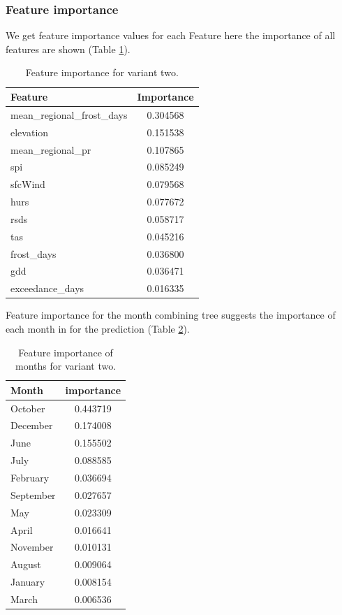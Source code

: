 \documentclass{article}
\begin{document}
\subsubsection{Feature importance}
We get feature importance values for each Feature here the importance of all features are shown (Table \ref{table:feature_importance_variant_2}).
\begin{table}[H]
	\centering
	\begin{tabular}{lc}
		\hline
		Feature                     & Importance \\
		\hline
		mean\_regional\_frost\_days & 0.304568   \\
		elevation                   & 0.151538   \\
		mean\_regional\_pr          & 0.107865   \\
		spi                         & 0.085249   \\
		sfcWind                     & 0.079568   \\
		hurs                        & 0.077672   \\
		rsds                        & 0.058717   \\
		tas                         & 0.045216   \\
		frost\_days                 & 0.036800   \\
		gdd                         & 0.036471   \\
		exceedance\_days            & 0.016335   \\
		\hline
	\end{tabular}
	\caption{\label{table:feature_importance_variant_2} Feature importance for variant two.}
\end{table}
Feature importance for the month combining tree suggests the importance of each month in for the prediction (Table \ref{table:feature_importance_months_variant_2}).
\begin{table}[H]
	\centering
	\begin{tabular}{lc}
		\hline
		Month     & importance \\
		\hline
		October   & 0.443719   \\
		December  & 0.174008   \\
		June      & 0.155502   \\
		July      & 0.088585   \\
		February  & 0.036694   \\
		September & 0.027657   \\
		May       & 0.023309   \\
		April     & 0.016641   \\
		November  & 0.010131   \\
		August    & 0.009064   \\
		January   & 0.008154   \\
		March     & 0.006536   \\
		\hline
	\end{tabular}
	\caption{\label{table:feature_importance_months_variant_2} Feature importance of months for variant two.}
\end{table}
\pagebreak
\end{document}
